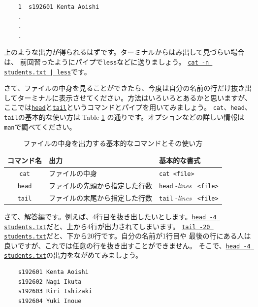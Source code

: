 \documentclass[a4j]{ltjreport}
\begin{document}
    \vspace*{3mm}

    \begin{verbatim}
    1  s192601 Kenta Aoishi                          
    .                                                
    .
    .
    \end{verbatim}

    上のような出力が得られるはずです。ターミナルからはみ出して見づらい場合は、
    前回習ったようにパイプで\verb+less+などに送りましょう。
    \underline{\texttt{cat -n students.txt | less}}です。

    さて、ファイルの中身を見ることができたら、今度は自分の名前の行だけ抜き出
    してターミナルに表示させてください。方法はいろいろとあるかと思いますが、
    ここでは\underline{\texttt{head}}と\underline{\texttt{tail}}というコマンドとパイプを用いてみましょう。
    \verb+cat+、\verb+head+、\verb+tail+の基本的な使い方は Table \ref{tab:cat}
    の通りです。オプションなどの詳しい情報は\verb+man+で調べてください。
    \begin{table}[htbp]
        \centering
        \caption{ファイルの中身を出力する基本的なコマンドとその使い方}
        \label{tab:cat}
        \begin{tabular}{cll}
            \hline
            \hline
            コマンド名 & 出力 & 基本的な書式\footnotemark \\
            \hline
            \texttt{cat}  & ファイルの中身              & \verb+cat <file>+ \\
            \texttt{head} & ファイルの先頭から指定した行数 & \verb+head+ -\textit{lines} \verb+ <file>+ \\
            \texttt{tail} & ファイルの末尾から指定した行数 & \verb+tail+ -\textit{lines} \verb+ <file>+ \\
            \hline
            \hline
        \end{tabular}
    \end{table}

    さて、解答編です。例えば、4行目を抜き出したいとします。\underline{\texttt{head
    -4 students.txt}}だと、上から4行が出力されてしまいます。
    \underline{\texttt{tail -20 students.txt}}だと、下から20行です。自分の名前が1行目や
    最後の行にある人は良いですが、これでは任意の行を抜き出すことができません。
    そこで、\underline{\texttt{head -4 students.txt}}の出力をながめてみましょう。
    \begin{verbatim}
    s192601 Kenta Aoishi
    s192602 Nagi Ikuta
    s192603 Riri Ishizaki
    s192604 Yuki Inoue
    \end{verbatim}
\end{document}
